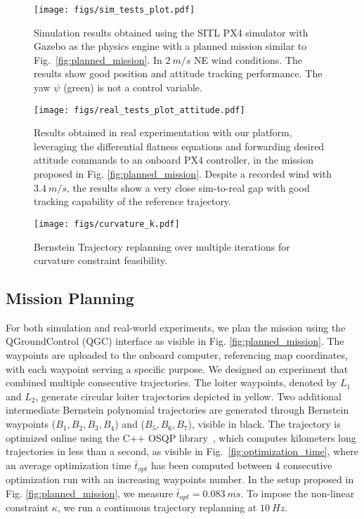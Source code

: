 \begin{figure*}[!t]
  \centering
  \texttt{[image: figs/sim\_tests\_plot.pdf]}
    \vspace{-20pt}
  \caption{Simulation results obtained using the SITL PX4 simulator with Gazebo as the physics engine with a planned mission similar to Fig.~\ref{fig:planned_mission}. In $2~\si{m/s}$ NE wind conditions. The results show good position and attitude tracking performance. The yaw $\psi$ (green) is not a control variable. 
  \label{fig:experiment_result}}
  \vspace{-10pt}
\end{figure*}


\begin{figure*}[!t]
  \centering
  \texttt{[image: figs/real\_tests\_plot\_attitude.pdf]}
    \vspace{-20pt}
  \caption{Results obtained in real experimentation with our platform, leveraging the differential flatness equations and forwarding desired attitude commands to an onboard PX4 controller, in the mission proposed in Fig. \ref{fig:planned_mission}. Despite a recorded wind with $3.4~\si{m/s}$, the results show a very close sim-to-real gap with good tracking capability of the reference trajectory.
  \label{fig:real_experiment_result}}
  \vspace{-20pt}
\end{figure*}


\begin{figure}[t]
  \centering
  \texttt{[image: figs/curvature\_k.pdf]}
  \caption{Bernstein Trajectory replanning over multiple iterations for curvature constraint feasibility. 
  \label{fig:curvature_k_result}}
  \vspace{-20pt}
\end{figure}

\subsection{Mission Planning}
For both simulation and real-world experiments, we plan the mission using the QGroundControl (QGC) interface as visible in Fig. \ref{fig:planned_mission}. The waypoints are uploaded to the onboard computer, referencing map coordinates, with each waypoint serving a specific purpose. We designed an experiment that combined multiple consecutive trajectories. The loiter waypoints, denoted by $L_1$ and $L_2$, generate circular loiter trajectories depicted in yellow. Two additional intermediate Bernstein polynomial trajectories are generated through Bernstein waypoints ($B_1, B_2, B_3, B_4$) and ($B_5, B_6, B_7$), visible in black. 
The trajectory is optimized online using the C++ OSQP library~\cite{osqp}, which computes kilometers long trajectories in less than a second, as visible in Fig.~\ref{fig:optimization_time}, where an average optimization time $\bar{t}_{opt}$ has been computed between $4$ consecutive optimization run with an increasing waypoints number. 
In the setup proposed in Fig. \ref{fig:planned_mission}, we measure $\bar{t}_{opt} = 0.083~\si{ms}$. To impose the non-linear constraint $\kappa$, we run a continuous trajectory replanning at $10~\si{Hz}$. 

